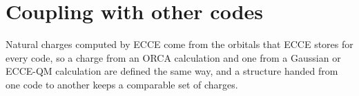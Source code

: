 
\section{Coupling with other codes}
Natural charges computed by ECCE come from the orbitals that ECCE stores for every code, so a charge from an ORCA calculation and one from a Gaussian or ECCE-QM calculation are defined the same way, and a structure handed from one code to another keeps a comparable set of charges.

